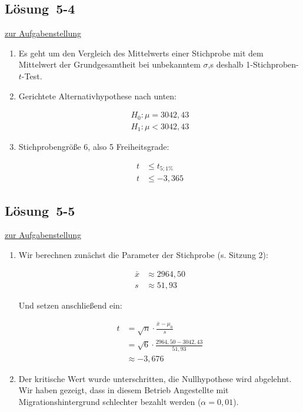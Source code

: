 \documentclass[
  11pt,
  ngerman,
  a4paper,
]{report}
\begin{document}
\hypertarget{loesung-5-4}{%
\subsection{Lösung~5-4}\label{loesung-5-4}}

\protect\hyperlink{aufgabe-5-4}{zur Aufgabenstellung}

\begin{enumerate}
\def\labelenumi{\alph{enumi})}
\item
  Es geht um den Vergleich des Mittelwerts einer Stichprobe mit dem Mittelwert der Grundgesamtheit bei unbekanntem \(\sigma\),s deshalb 1-Stichproben-\(t\)-Test.
\item
  Gerichtete Alternativhypothese nach unten:

  \[\begin{aligned}
   H_0: \mu=3042,43\\
   H_1: \mu < 3042,43
   \end{aligned}\]
\item
  Stichprobengröße 6, also 5 Freiheitsgrade:

  \[\begin{aligned}
   t &\leq t_{5;1\%}\\
   t &\leq -3,365
   \end{aligned}\]
\end{enumerate}

\hypertarget{loesung-5-5}{%
\subsection{Lösung~5-5}\label{loesung-5-5}}

\protect\hyperlink{aufgabe-5-5}{zur Aufgabenstellung}

\begin{enumerate}
\def\labelenumi{\alph{enumi})}
\item
  Wir berechnen zunächst die Parameter der Stichprobe (s. Sitzung 2):

  \[\begin{aligned}
   \bar{x}&\approx2964,50\\
   s&\approx 51,93
   \end{aligned}\]

  Und setzen anschließend ein:

  \[\begin{aligned}
   t &= \sqrt{n}\cdot\frac{\bar{x}-\mu_0}{s}\\[5pt]
   &=\sqrt{6}\cdot\frac{2964,50-3042,43}{51,93}\\
   &\approx-3,676
   \end{aligned}\]
\item
  Der kritische Wert wurde unterschritten, die Nullhypothese wird abgelehnt. Wir haben gezeigt, dass in diesem Betrieb Angestellte mit Migrationshintergrund schlechter bezahlt werden (\(\alpha=0,01\)).
\end{enumerate}
\end{document}
